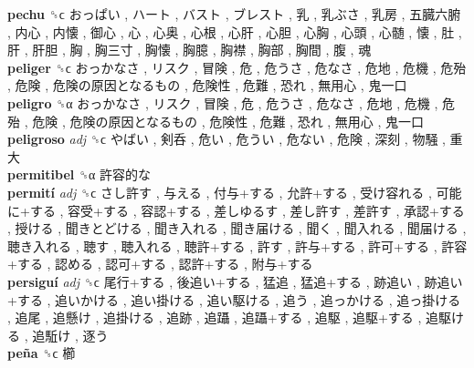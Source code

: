 \textbf{pechu} ␝ϲ   おっぱい ,  ハート ,  バスト ,  ブレスト ,  乳 ,  乳ぶさ ,  乳房 ,  五臓六腑 ,  内心 ,  内懐 ,  御心 ,  心 ,  心奥 ,  心根 ,  心肝 ,  心胆 ,  心胸 ,  心頭 ,  心髄 ,  懐 ,  肚 ,  肝 ,  肝胆 ,  胸 ,  胸三寸 ,  胸懐 ,  胸臆 ,  胸襟 ,  胸部 ,  胸間 ,  腹 ,  魂   \\
\textbf{peliger} ␝ϲ   おっかなさ ,  リスク ,  冒険 ,  危 ,  危うさ ,  危なさ ,  危地 ,  危機 ,  危殆 ,  危険 ,  危険の原因となるもの ,  危険性 ,  危難 ,  恐れ ,  無用心 ,  鬼一口   \\
\textbf{peligro} ␝α   おっかなさ ,  リスク ,  冒険 ,  危 ,  危うさ ,  危なさ ,  危地 ,  危機 ,  危殆 ,  危険 ,  危険の原因となるもの ,  危険性 ,  危難 ,  恐れ ,  無用心 ,  鬼一口   \\
\textbf{peligroso} \emph{adj}  ␝ϲ   やばい ,  剣呑 ,  危い ,  危うい ,  危ない ,  危険 ,  深刻 ,  物騒 ,  重大   \\
\textbf{permitibel} ␝α   許容的な   \\
\textbf{permití} \emph{adj}  ␝ϲ   さし許す ,  与える ,  付与+する ,  允許+する ,  受け容れる ,  可能に+する ,  容受+する ,  容認+する ,  差しゆるす ,  差し許す ,  差許す ,  承認+する ,  授ける ,  聞きとどける ,  聞き入れる ,  聞き届ける ,  聞く ,  聞入れる ,  聞届ける ,  聴き入れる ,  聴す ,  聴入れる ,  聴許+する ,  許す ,  許与+する ,  許可+する ,  許容+する ,  認める ,  認可+する ,  認許+する ,  附与+する   \\
\textbf{persiguí} \emph{adj}  ␝ϲ   尾行+する ,  後追い+する ,  猛追 ,  猛追+する ,  跡追い ,  跡追い+する ,  追いかける ,  追い掛ける ,  追い駆ける ,  追う ,  追っかける ,  追っ掛ける ,  追尾 ,  追懸け ,  追掛ける ,  追跡 ,  追躡 ,  追躡+する ,  追駆 ,  追駆+する ,  追駆ける ,  追駈け ,  逐う   \\
\textbf{peña} ␝ϲ   櫛   \\

